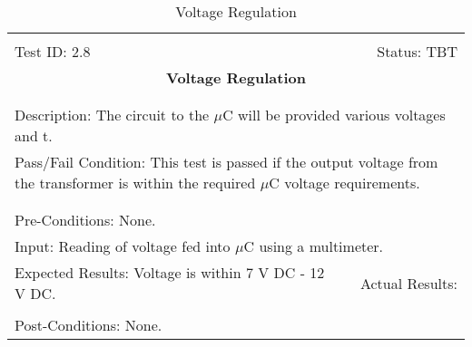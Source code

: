 \documentclass[titlepage]{article}
\begin{document}
\begin{center}%
\begin{table}
\begin{tabular}{|l r|}\hline&\\[-2mm]
	Test ID: 2.8	&Status: TBT\\[-3mm]
	\multicolumn{2}{|c|}{\textbf{\large{Voltage Regulation}}}\\&\\\hline&\\[-3mm]
	\multicolumn{2}{|p{\textwidth}|}{Description: The circuit to the $\mu$C will be provided various voltages and t.}\\[1mm]
	\multicolumn{2}{|p{\textwidth}|}{Pass/Fail Condition: This test is passed if the output voltage from the transformer is within the required $\mu$C voltage requirements.}\\[1mm]\hline&\\[-3mm]\hline&\\[-3mm]%
	\multicolumn{2}{|p{\textwidth}|}{Pre-Conditions: None.}\\[4mm]
	\multicolumn{2}{|p{\textwidth}|}{Input: Reading of voltage fed into $\mu$C using a multimeter.}\\[2mm]\hline
	\multicolumn{1}{|p{0.49\textwidth}}{Expected Results: Voltage is within 7 V DC - 12 V DC.}	&\multicolumn{1}{|p{0.45\textwidth}|}{Actual Results:}\\\hline&\\[-3mm]
	\multicolumn{2}{|p{\textwidth}|}{Post-Conditions: None.}\\\hline
\end{tabular}
\caption{Voltage Regulation}
\end{table}
\end{center}
\end{document}

